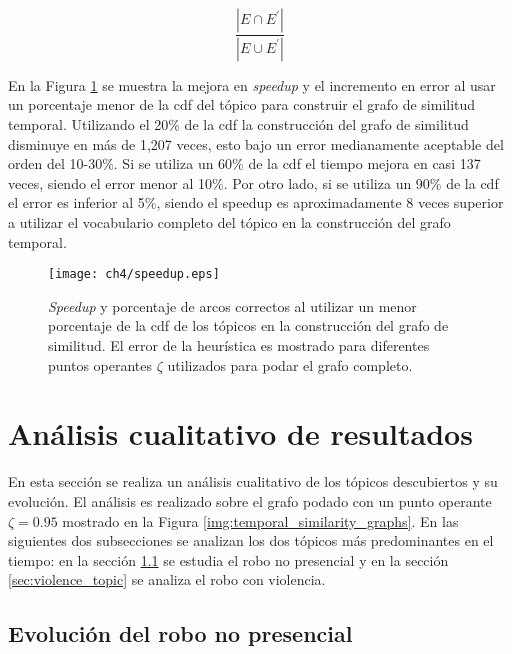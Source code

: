 \begin{equation}
  \frac{|E\cap E^{'}|}{|E\cup E^{'}|}
\end{equation}

En la Figura \ref{img:speedup} se muestra la mejora en \textit{speedup} y el incremento en error al usar un porcentaje menor de la cdf del tópico para construir el grafo de similitud temporal. Utilizando el 20\% de la cdf la construcción del grafo de similitud disminuye en más de 1,207 veces, esto bajo un error medianamente aceptable del orden del 10-30\%. Si se utiliza un 60\% de la cdf el tiempo mejora en casi 137 veces, siendo el error menor al 10\%. Por otro lado, si se utiliza un 90\% de la cdf el error es inferior al 5\%, siendo el speedup es aproximadamente 8 veces superior a utilizar el vocabulario completo del tópico en la construcción del grafo temporal.

\begin{figure}
    \centering
    \texttt{[image: ch4/speedup.eps]}
    \caption{\textit{Speedup} y porcentaje de arcos correctos al utilizar un menor porcentaje de la cdf de los tópicos en la construcción del grafo de similitud. El error de la heurística es mostrado para diferentes puntos operantes $\zeta$ utilizados para podar el grafo completo.} 
    \label{img:speedup}
\end{figure}

\section{Análisis cualitativo de resultados}
\label{sec:qualitative}

En esta sección se realiza un análisis cualitativo de los tópicos descubiertos y su evolución. El análisis es realizado sobre el grafo podado con un punto operante $\zeta = 0.95$ mostrado en la Figura \ref{img:temporal_similarity_graphs}. En las siguientes dos subsecciones se analizan los dos tópicos más predominantes en el tiempo: en la sección \ref{sec:noviolence_topic} se estudia el robo no presencial y en la sección \ref{sec:violence_topic} se analiza el robo con violencia.

\subsection{Evolución del robo no presencial}
\label{sec:noviolence_topic}

